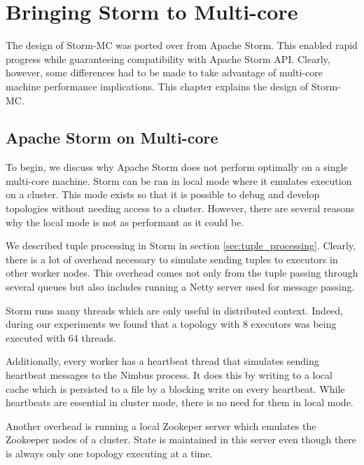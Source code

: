 \chapter{Bringing Storm to Multi-core}



The design of Storm-MC was ported over from Apache Storm. This enabled rapid progress while guaranteeing compatibility with Apache Storm API. Clearly, however, some differences had to be made to take advantage of multi-core machine performance implications. This chapter explains the design of Storm-MC.

\section{Apache Storm on Multi-core}

To begin, we discuss why Apache Storm does not perform optimally on a single multi-core machine. Storm can be ran in local mode where it emulates execution on a cluster. This mode exists so that it is possible to debug and develop topologies without needing access to a cluster. However, there are several reasons why the local mode is not as performant as it could be.

We described tuple processing in Storm in section \ref{sec:tuple_processing}. Clearly, there is a lot of overhead necessary to simulate sending tuples to executors in other worker nodes. This overhead comes not only from the tuple passing through several queues but also includes running a Netty \cite{Netty} server used for message passing.

Storm runs many threads which are only useful in distributed context. Indeed, during our experiments we found that a topology with 8 executors was being executed with 64 threads.


Additionally, every worker has a heartbeat thread that simulates sending heartbeat messages to the Nimbus process. It does this by writing to a local cache which is persisted to a file by a blocking write on every heartbeat. While heartbeats are essential in cluster mode, there is no need for them in local mode.

Another overhead is running a local Zookeper server which emulates the Zookeeper nodes of a cluster. State is maintained in this server even though there is always only one topology executing at a time.

